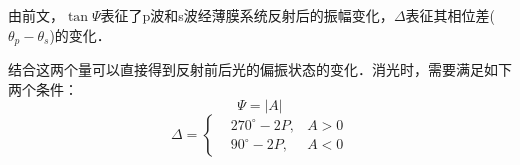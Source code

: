 
由前文，$\tan\Psi$表征了p波和s波经薄膜系统反射后的振幅变化，$\Delta$表征其相位差($\theta_p - \theta_s$)的变化．

结合这两个量可以直接得到反射前后光的偏振状态的变化．消光时，需要满足如下两个条件：
$$\Psi=|A|$$
$$\Delta=\left\{\begin{aligned}&270^\circ-2P,&A>0\\&90^\circ-2P,&A<0\end{aligned}\right.$$
